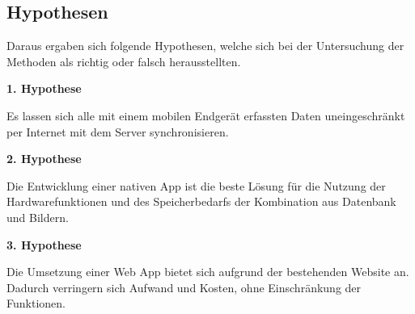 \cleardoublepage

\subsection{Hypothesen}
\label{subsec:hypothesis:hypo}

Daraus ergaben sich folgende Hypothesen, welche sich bei der Untersuchung der Methoden als richtig oder falsch herausstellten.

\textbf {1. Hypothese}

Es lassen sich alle mit einem mobilen Endgerät erfassten Daten uneingeschränkt per Internet mit dem Server synchronisieren.

\textbf {2. Hypothese}

Die Entwicklung einer nativen App ist die beste Lösung für die Nutzung der Hardwarefunktionen und des Speicherbedarfs der Kombination aus Datenbank und Bildern.

\textbf {3. Hypothese}

Die Umsetzung einer Web App bietet sich aufgrund der bestehenden Website an. Dadurch verringern sich Aufwand und Kosten, ohne Einschränkung der Funktionen.
